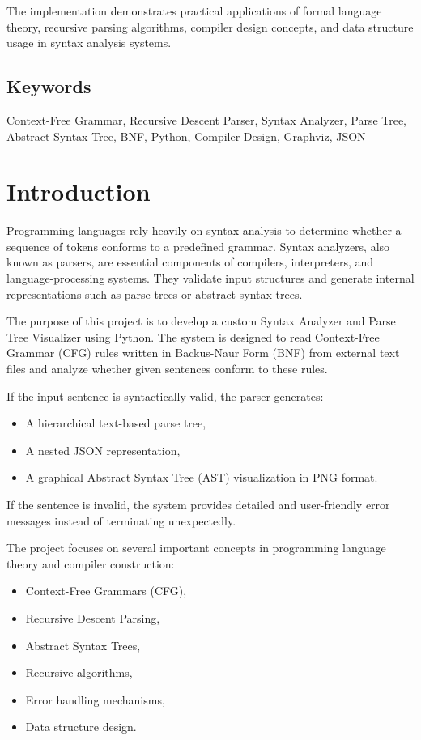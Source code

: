 \documentclass[12pt,a4paper]{article}
\begin{document}
The implementation demonstrates practical applications of formal language theory, recursive parsing algorithms, compiler design concepts, and data structure usage in syntax analysis systems.
	\subsection*{Keywords}
	Context-Free Grammar, Recursive Descent Parser, Syntax Analyzer, Parse Tree, Abstract Syntax Tree, BNF, Python, Compiler Design, Graphviz, JSON
	
	
	\section{Introduction}
	Programming languages rely heavily on syntax analysis to determine whether a sequence of tokens conforms to a predefined grammar. Syntax analyzers, also known as parsers, are essential components of compilers, interpreters, and language-processing systems. They validate input structures and generate internal representations such as parse trees or abstract syntax trees.

The purpose of this project is to develop a custom Syntax Analyzer and Parse Tree Visualizer using Python. The system is designed to read Context-Free Grammar (CFG) rules written in Backus-Naur Form (BNF) from external text files and analyze whether given sentences conform to these rules.

If the input sentence is syntactically valid, the parser generates:
\begin{itemize}
    \item A hierarchical text-based parse tree,
    \item A nested JSON representation,
    \item A graphical Abstract Syntax Tree (AST) visualization in PNG format.
\end{itemize}

If the sentence is invalid, the system provides detailed and user-friendly error messages instead of terminating unexpectedly.

The project focuses on several important concepts in programming language theory and compiler construction:
\begin{itemize}
    \item Context-Free Grammars (CFG),
    \item Recursive Descent Parsing,
    \item Abstract Syntax Trees,
    \item Recursive algorithms,
    \item Error handling mechanisms,
    \item Data structure design.
\end{itemize}
\end{document}

